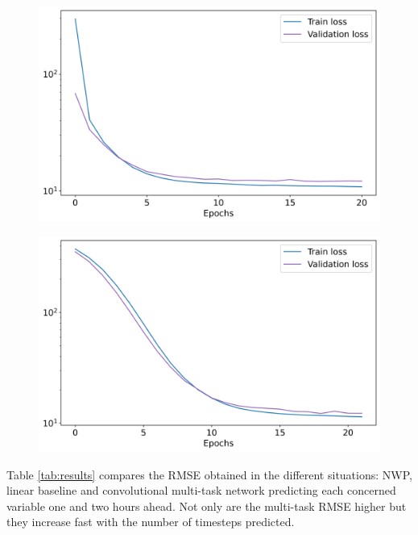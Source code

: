 \documentclass{article}
\newcommand{\saut}{\vspace{10px}}
\begin{document}
\begin{figure}[H]
\centering
\begin{minipage}{.5\textwidth}
	\centering
	\includegraphics[width=.95\linewidth]{img/restrain.png}
	\label{fig:Res}
\end{minipage}%
\begin{minipage}{.5\textwidth}
	\centering
	\includegraphics[width=.95\linewidth]{img/convtrain.png}
	\label{fig:Conv}
\end{minipage}
\end{figure}

\saut

Table \ref{tab:results} compares the RMSE obtained in the different situations: NWP, linear baseline and convolutional
multi-task network predicting each concerned variable one and two hours ahead. Not only are the multi-task
RMSE higher but they increase fast with the number of timesteps predicted.

\saut
\end{document}
